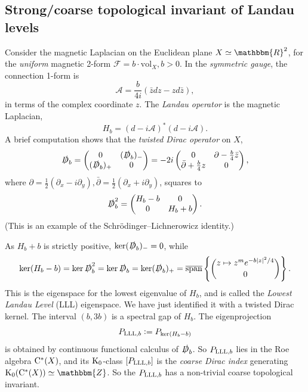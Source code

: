 \documentclass{amsart}
\numberwithin{figure}{section}
\numberwithin{equation}{section}
\numberwithin{table}{section}
\theoremstyle{plain}
\theoremstyle{definition}
\theoremstyle{remark}
\theoremstyle{nonumber}
\newcommand{\Z}{\mathbb{Z}}
\newcommand{\R}{\mathbb{R}}
\newcommand{\K}{\relax\ifmmode\operatorname{K}\else\textup{K}\fi}
\newcommand{\Cst}{\relax\ifmmode\mathrm{C}^*\else\textup{C*}\fi}
\newcommand{\defeq}{\mathrel{\vcentcolon=}}
\renewcommand{\mathbb}{\mathbbm} %
\begin{document}
\subsection{Strong/coarse topological invariant of Landau
levels}\label{sec:Landau_level}
Consider the magnetic Laplacian on the Euclidean plane $X\simeq \R^2$, for the \emph{uniform} magnetic 2-form $\mathscr{F}=b\cdot\mathrm{vol}_X, b>0$. In the \emph{symmetric gauge}, the connection 1-form is
\[
\mathscr{A}=\frac{b}{4i}(\bar{z}dz-z d\bar{z}),
\]
in terms of the complex coordinate $z$. The \emph{Landau operator} is the magnetic Laplacian,
\[
H_b=(d-i\mathscr{A})^*(d-i\mathscr{A}).
\]
A brief computation shows that the \emph{twisted Dirac operator} on $X$,  
\begin{equation}\label{eq:twisted_Dirac_operator}
\slashed{D}_b=\begin{pmatrix}0 & (\slashed{D}_b)_-\\ (\slashed{D}_b)_+ & 0 \end{pmatrix}=-2i\begin{pmatrix} 0 & \partial -\frac{b}{4}\bar{z} \\ \bar{\partial}+\frac{b}{4}z & 0\end{pmatrix},
\end{equation}
where $\partial=\frac{1}{2}(\partial_x-i\partial_y),
\bar{\partial}=\frac{1}{2}(\partial_x+i\partial_y)$, squares to
\[
\slashed{D}_b^2=\begin{pmatrix} H_b-b & 0 \\ 0 & H_b+b\end{pmatrix}.
\]
(This is an example of the Schr\"{o}dinger--Lichnerowicz identity.)

As $H_b+b$ is strictly positive, $\ker(\slashed{D}_b)_-=0$, while
\[
\ker(H_b-b)=\ker \slashed{D}_b^2=\ker \slashed{D}_b=\ker (\slashed{D}_b)_+=\overline{\mathrm{span}}\left\{\binom{z\mapsto z^me^{-b|z|^2/4}}{0}\right\}.
\]
This is the eigenspace for the lowest eigenvalue of $H_b$, and is called the \emph{Lowest Landau Level} (LLL) eigenspace. We have just identified it with a twisted Dirac kernel. The interval $(b,3b)$ is a spectral gap of $H_b$. The eigenprojection
\[
P_{{\rm LLL},b}\defeq P_{\ker (H_b-b)}
\]
is obtained by continuous functional calculus of $\slashed{D}_b$. So $P_{{\rm LLL},b}$ lies in the Roe algebra $\Cst(X)$, and its $\K_0$-class $[P_{{\rm LLL},b}]$ is the \emph{coarse Dirac index} \cite{Roe:Index_theory_coarse_geometry} generating $\K_0(\Cst(X))\simeq\Z$. So the $P_{{\rm LLL},b}$ has a non-trivial coarse topological invariant. 
\end{document}

